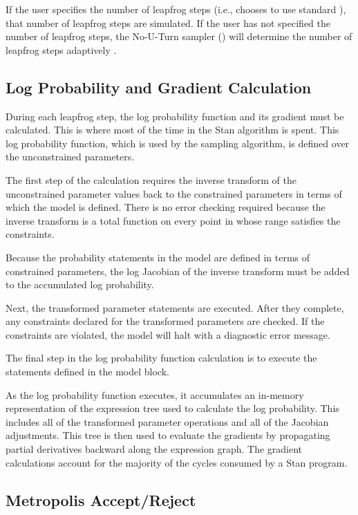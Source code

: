If the user specifies the number of leapfrog steps (i.e., chooses to
use standard \HMC), that number of leapfrog steps are simulated.  If
the user has not specified the number of leapfrog steps, the No-U-Turn
sampler (\NUTS) will determine the number of leapfrog steps adaptively
\citep{Hoffman-Gelman:2011, Hoffman-Gelman:2014}.

\subsection{Log Probability and Gradient Calculation}

During each leapfrog step, the log probability function and its
gradient must be calculated.  This is where most of the time in the
Stan algorithm is spent.  This log probability function, which is
used by the sampling algorithm, is defined over the unconstrained
parameters.

The first step of the calculation requires the inverse transform of
the unconstrained parameter values back to the constrained parameters
in terms of which the model is defined.  There is no error checking
required because the inverse transform is a total function on every point
in whose range satisfies the constraints.

Because the probability statements in the model are defined in terms
of constrained parameters, the log Jacobian of the inverse transform
must be added to the accumulated log probability.

Next, the transformed parameter statements are executed.  After they
complete, any constraints declared for the transformed parameters are
checked.  If the constraints are violated, the model will halt with a
diagnostic error message.

The final step in the log probability function calculation is to
execute the statements defined in the model block.

As the log probability function executes, it accumulates an in-memory
representation of the expression tree used to calculate the log
probability.  This includes all of the transformed parameter
operations and all of the Jacobian adjustments.  This tree is then
used to evaluate the gradients by propagating partial derivatives
backward along the expression graph.  The gradient calculations
account for the majority of the cycles consumed by a Stan program.

\subsection{Metropolis Accept/Reject}

